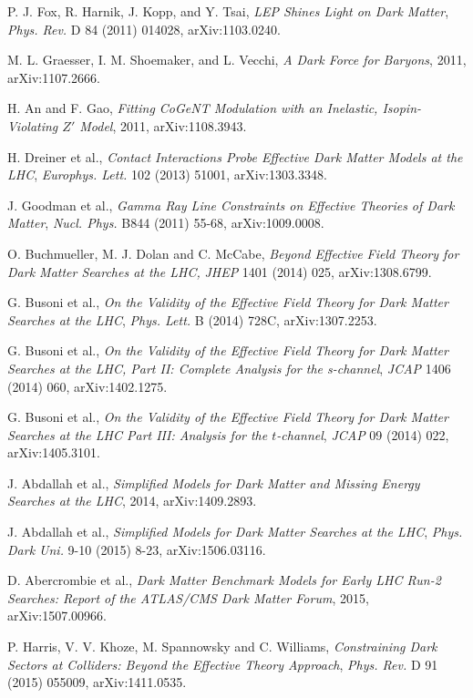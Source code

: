  P. J. Fox, R. Harnik, J. Kopp, and Y. Tsai, \emph{LEP Shines Light on Dark Matter}, \emph{Phys. Rev.} D 84 (2011) 014028, arXiv:1103.0240.

 M. L. Graesser, I. M. Shoemaker, and L. Vecchi, \emph{A Dark Force for Baryons}, 2011, arXiv:1107.2666.

 H. An and F. Gao, \emph{Fitting CoGeNT Modulation with an Inelastic, Isopin-Violating $Z'$ Model}, 2011, arXiv:1108.3943.

 H. Dreiner et al., \emph{Contact Interactions Probe Effective Dark Matter Models at the LHC}, \emph{Europhys. Lett.} 102 (2013) 51001, arXiv:1303.3348.

 J. Goodman et al., \emph{Gamma Ray Line Constraints on Effective Theories of Dark Matter}, \emph{Nucl. Phys.} B844 (2011) 55-68, arXiv:1009.0008.

 O. Buchmueller, M. J. Dolan and C. McCabe,
  \emph{Beyond Effective Field Theory for Dark Matter Searches at the LHC,}
  \emph{JHEP} 1401 (2014) 025,
  arXiv:1308.6799.

 G. Busoni et al., \emph{On the Validity of the Effective Field Theory for Dark Matter Searches at the LHC}, \emph{Phys. Lett.} B (2014) 728C, arXiv:1307.2253.

 G. Busoni et al., \emph{On the Validity of the Effective Field Theory for Dark Matter Searches at the LHC, Part II: Complete Analysis for the s-channel}, \emph{JCAP} 1406 (2014) 060, arXiv:1402.1275.

 G. Busoni et al., \emph{On the Validity of the Effective Field Theory for Dark Matter Searches at the LHC Part III: Analysis for the $t$-channel}, \emph{JCAP} 09 (2014) 022, arXiv:1405.3101.

 J. Abdallah et al., \emph{Simplified Models for Dark Matter and Missing Energy Searches at the LHC}, 2014, arXiv:1409.2893.

 J. Abdallah et al., \emph{Simplified Models for Dark Matter Searches at the LHC}, \emph{Phys. Dark Uni.} 9-10 (2015) 8-23, arXiv:1506.03116.

 D. Abercrombie et al., \emph{Dark Matter Benchmark Models for Early LHC Run-2 Searches: Report of the ATLAS/CMS Dark Matter Forum}, 2015, arXiv:1507.00966.

 P. Harris, V. V. Khoze, M. Spannowsky and C. Williams, \emph{Constraining Dark Sectors at Colliders: Beyond the Effective Theory Approach}, \emph{Phys. Rev.} D 91 (2015) 055009, arXiv:1411.0535.


